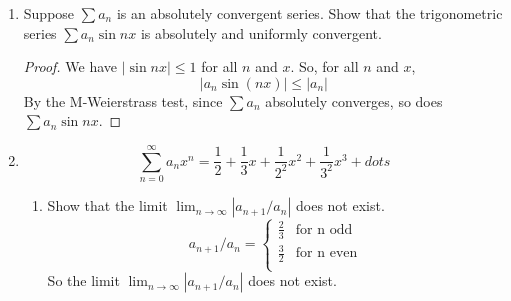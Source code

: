 \documentclass[hidelinks,12pt]{article}
\title{\scalebox{2}{Math 524 Homework 2}}
\author{\scalebox{1.5}{Theo Koss}}
\date{Feburary 2024}
\renewcommand{\leq}{\leqslant}
\begin{document}
\maketitle
\begin{enumerate}
    \item Suppose $\sum a_n$ is an absolutely convergent series. Show that the trigonometric series $\sum a_n\sin nx$ is absolutely and uniformly convergent.
        \begin{proof}[Proof]
            We have $|\sin nx|\leq1$ for all $n$ and $x$. So, for all $n$ and $x$, \[|a_n\sin(nx)|\leq|a_n|\] By the M-Weierstrass test, since $\sum a_n$ absolutely converges, so does $\sum a_n\sin nx$.
        \end{proof}
    \item \[\sum_{n=0}^{\infty}a_nx^n=\frac{1}{2}+\frac{1}{3}x+\frac{1}{2^2}x^2+\frac{1}{3^2}x^3+dots\]
        \begin{enumerate}
            \item Show that the limit $\lim_{n\to\infty}|a_{n+1}/a_n|$ does not exist.
                \[a_{n+1}/a_n=\begin{cases}
                    \frac{2}{3} & \text{for n odd}\\
                    \frac{3}{2} & \text{for n even}\\
                \end{cases}\]
                So the limit $\lim_{n\to\infty}|a_{n+1}/a_n|$ does not exist.


\end{enumerate}
\end{enumerate}
\end{document}
